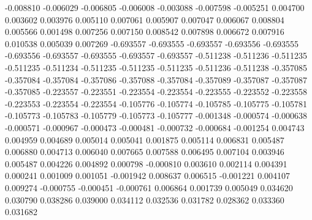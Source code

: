 -0.008810
-0.006029
-0.006805
-0.006008
-0.003088
-0.007598
-0.005251
0.004700
0.003602
0.003976
0.005110
0.007061
0.005907
0.007047
0.006067
0.008804
0.005566
0.001498
0.007256
0.007150
0.008542
0.007898
0.006672
0.007916
0.010538
0.005039
0.007269
-0.693557
-0.693555
-0.693557
-0.693556
-0.693555
-0.693556
-0.693557
-0.693555
-0.693557
-0.693557
-0.511238
-0.511236
-0.511235
-0.511235
-0.511234
-0.511235
-0.511235
-0.511235
-0.511236
-0.511238
-0.357085
-0.357084
-0.357084
-0.357086
-0.357088
-0.357084
-0.357089
-0.357087
-0.357087
-0.357085
-0.223557
-0.223551
-0.223554
-0.223554
-0.223555
-0.223552
-0.223558
-0.223553
-0.223554
-0.223554
-0.105776
-0.105774
-0.105785
-0.105775
-0.105781
-0.105773
-0.105783
-0.105779
-0.105773
-0.105777
-0.001348
-0.000574
-0.000638
-0.000571
-0.000967
-0.000473
-0.000481
-0.000732
-0.000684
-0.001254
0.004743
0.004959
0.004689
0.005014
0.005041
0.001875
0.005114
0.006831
0.005487
0.006880
0.004713
0.006040
0.007665
0.007588
0.006495
0.007104
0.003946
0.005487
0.004226
0.004892
0.000798
-0.000810
0.003610
0.002114
0.004391
0.000241
0.001009
0.001051
-0.001942
0.008637
0.006515
-0.001221
0.004107
0.009274
-0.000755
-0.000451
-0.000761
0.006864
0.001739
0.005049
0.034620
0.030790
0.038286
0.039000
0.034112
0.032536
0.031782
0.028362
0.033360
0.031682
